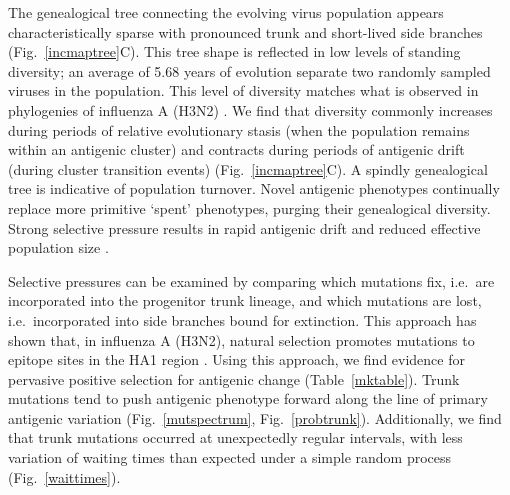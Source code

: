 The genealogical tree connecting the evolving virus population appears characteristically sparse with pronounced trunk and short-lived side branches  (Fig.~\ref{incmaptree}C).  This tree shape is reflected in low levels of standing diversity; an average of 5.68 years of evolution separate two randomly sampled viruses in the population.  This level of diversity matches what is observed in phylogenies of influenza A (H3N2) \cite{Rambaut08}.  We find that diversity commonly increases during periods of relative evolutionary stasis (when the population remains within an antigenic cluster) and contracts during periods of antigenic drift (during cluster transition events) (Fig.~\ref{incmaptree}C).  A spindly genealogical tree is indicative of population turnover.  Novel antigenic phenotypes continually replace more primitive `spent' phenotypes, purging their genealogical diversity.  Strong selective pressure results in rapid antigenic drift and reduced effective population size \cite{BedfordBMC11}.

Selective pressures can be examined by comparing which mutations fix, i.e.\ are incorporated into the progenitor trunk lineage, and which mutations are lost, i.e.\ incorporated into side branches bound for extinction.  This approach has shown that, in influenza A (H3N2), natural selection promotes mutations to epitope sites in the HA1 region \cite{Bush99MBE,Wolf06,Bhatt11}.  Using this approach, we find evidence for pervasive positive selection for antigenic change (Table~\ref{mktable}).  Trunk mutations tend to push antigenic phenotype forward along the line of primary antigenic variation (Fig.~\ref{mutspectrum}, Fig.~\ref{probtrunk}).  Additionally, we find that trunk mutations occurred at unexpectedly regular intervals, with less variation of waiting times than expected under a simple random process (Fig.~\ref{waittimes}).

